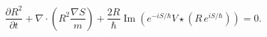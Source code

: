 \begin{equation}
\frac{\partial R^{2}}{\partial t}+\nabla\cdot\left(  R^{2}\frac{\nabla S}%
{m}\right)  +\frac{2R}{\hbar}\operatorname{Im}\left(  e^{-iS/\hbar}%
V\star\left(  R\,e^{iS/\hbar}\right)  \right)  =0.\label{19}%
\end{equation}

